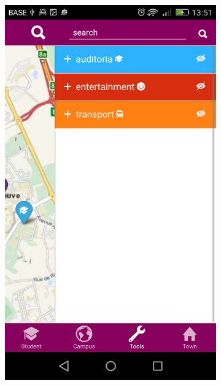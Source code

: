 \documentclass{eplmastersthesis}
\begin{document}
\begin{figure}
    \centering
\begin{subfigure}[b]{0.3\textwidth}
        \includegraphics[width=\textwidth]{Images/Application_screens/Screenshot_2016-06-06-13-51-21.png}
    \end{subfigure}
    ~ %
    \begin{subfigure}[b]{0.3\textwidth}

\end{subfigure}
\end{figure}
\end{document}
